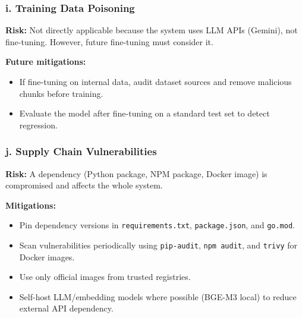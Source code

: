 \subsubsection*{i. Training Data Poisoning}

\textbf{Risk:} Not directly applicable because the system uses LLM APIs
(Gemini), not fine-tuning. However, future fine-tuning must consider it.

\textbf{Future mitigations:}
\begin{itemize}
    \item If fine-tuning on internal data, audit dataset sources and
          remove malicious chunks before training.
    \item Evaluate the model after fine-tuning on a standard test set to
          detect regression.
\end{itemize}

\subsubsection*{j. Supply Chain Vulnerabilities}

\textbf{Risk:} A dependency (Python package, NPM package, Docker image) is
compromised and affects the whole system.

\textbf{Mitigations:}
\begin{itemize}
    \item Pin dependency versions in \texttt{requirements.txt},
          \texttt{package.json}, and \texttt{go.mod}.
    \item Scan vulnerabilities periodically using \texttt{pip-audit},
          \texttt{npm audit}, and \texttt{trivy} for Docker images.
    \item Use only official images from trusted registries.
    \item Self-host LLM/embedding models where possible (BGE-M3 local) to
          reduce external API dependency.
\end{itemize}
